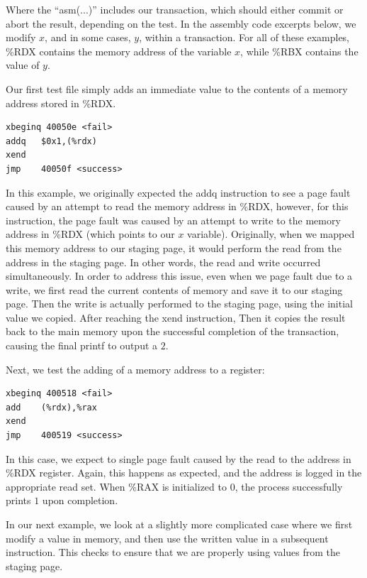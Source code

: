 \documentclass{acm_proc_article-sp}
\begin{document}
Where the ``asm(...)'' includes our transaction, which should either commit or
abort the result, depending on the test. In the assembly code excerpts below,
we modify $x$, and in some cases, $y$, within a transaction.  For all of these
examples, \%RDX contains the memory address of the variable $x$, while \%RBX
contains the value of $y$.

Our first test file simply adds an immediate value to the contents of a memory
address stored in \%RDX.

\begin{verbatim}
xbeginq 40050e <fail>
addq   $0x1,(%rdx)
xend   
jmp    40050f <success>
\end{verbatim}

In this example, we originally expected the addq instruction to see a page
fault caused by an attempt to read the memory address in \%RDX, however, for
this instruction, the page fault was caused by an attempt to write to the
memory address in \%RDX (which points to our $x$ variable). Originally, when we
mapped this memory address to our staging page, it would perform the read from
the address in the staging page.  In other words, the read and write occurred
simultaneously.  In order to address this issue, even when we page fault due to
a write, we first read the current contents of memory and save it to our
staging page. Then the write is actually performed to the staging page, using
the initial value we copied.  After reaching the xend instruction,  Then it
copies the result back to the main memory upon the successful completion of the
transaction, causing the final printf to output a $2$.

Next, we test the adding of a memory address to a register:

\begin{verbatim}
xbeginq 400518 <fail>
add    (%rdx),%rax
xend   
jmp    400519 <success>
\end{verbatim}

In this case, we expect to single page fault caused by the read to the address
in \%RDX register. Again, this happens as expected, and the address is logged
in the appropriate read set. When \%RAX is initialized to 0, the process 
successfully prints $1$ upon completion.


In our next example, we look at a slightly more complicated case where we first
modify a value in memory, and then use the written value in a subsequent
instruction. This checks to ensure that we are properly using values from the
staging page. 
\end{document}
